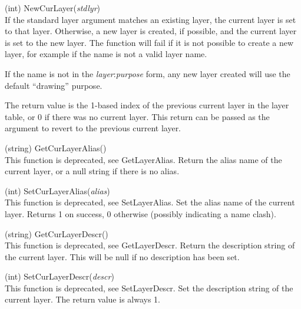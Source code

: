 \begin{description}
\item{(int) \vt NewCurLayer({\it stdlyr\/})}\\
If the standard layer argument matches an existing layer, the current
layer is set to that layer.  Otherwise, a new layer is created, if
possible, and the current layer is set to the new layer.  The function
will fail if it is not possible to create a new layer, for example if
the name is not a valid layer name.

If the name is not in the {\it layer\/}{\vt :}{\it purpose} form, any
new layer created will use the default ``{\vt drawing}'' purpose.

The return value is the 1-based index of the previous current layer in
the layer table, or 0 if there was no current layer.  This return can
be passed as the argument to revert to the previous current layer.

\item{(string) \vt GetCurLayerAlias()}\\
This function is deprecated, see {\vt GetLayerAlias}.  Return the
alias name of the current layer, or a null string if there is no
alias.

\item{(int) \vt SetCurLayerAlias({\it alias\/})}\\
This function is deprecated, see {\vt SetLayerAlias}.  Set the alias
name of the current layer.  Returns 1 on success, 0 otherwise
(possibly indicating a name clash).

\item{(string) \vt GetCurLayerDescr()}\\
This function is deprecated, see {\vt GetLayerDescr}.  Return the
description string of the current layer.  This will be null if no
description has been set.

\item{(int) \vt SetCurLayerDescr({\it descr\/})}\\
This function is deprecated, see {\vt SetLayerDescr}.  Set the
description string of the current layer.  The return value is always
1.
\end{description}


